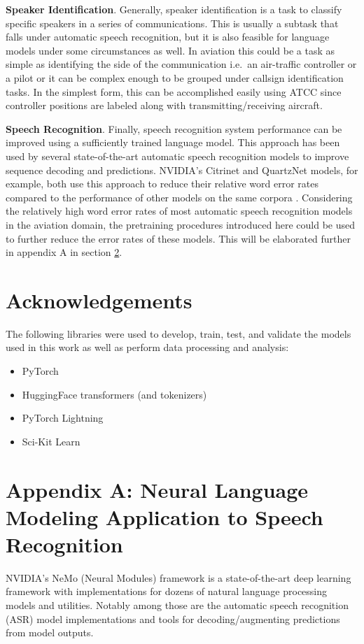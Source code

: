 \documentclass[12pt]{article}
\begin{document}
\textbf{Speaker Identification}. Generally, speaker identification is a task to classify specific speakers in a series of communications. This is
usually a subtask that falls under automatic speech recognition, but it is also feasible for language models under some circumstances as well. In
aviation this could be a task as simple as identifying the side of the communication i.e.~an air-traffic controller or a pilot or it can be complex
enough to be grouped under callsign identification tasks. In the simplest form, this can be accomplished easily using ATCC since controller positions
are labeled along with transmitting/receiving aircraft.

\textbf{Speech Recognition}. Finally, speech recognition system performance can be improved using a sufficiently trained language model. This approach
has been used by several state-of-the-art automatic speech recognition models to improve sequence decoding and predictions. NVIDIA's Citrinet and
QuartzNet models, for example, both use this approach to reduce their relative word error rates compared to the performance of other models on the
same corpora \cite{majumdar_citrinet_2021,kriman_quartznet_2020}. Considering the relatively high word error rates of most automatic speech
recognition models in the aviation domain, the pretraining procedures introduced here could be used to further reduce the error rates of these models.
This will be elaborated further in appendix A in section \ref{sec:appendix_a}.

\newpage
\section{Acknowledgements}
The following libraries were used to develop, train, test, and validate the models used in this work as well as perform data processing and analysis:
\begin{itemize}
    \item PyTorch \cite{paszke_pytorch_2019}
    \item HuggingFace transformers (and tokenizers) \cite{wolf_transformers_2020}
    \item PyTorch Lightning \cite{falcon_pytorchlightning_2019}
    \item Sci-Kit Learn \cite{pedregosa_scikit-learn_2011}
\end{itemize}

\newpage
\section{Appendix A: Neural Language Modeling Application to Speech Recognition}\label{sec:appendix_a}
NVIDIA's NeMo (Neural Modules) framework \cite{kuchaiev_nemo_2019} is a state-of-the-art deep learning framework with implementations for dozens of
natural language processing models and utilities. Notably among those are the automatic speech recognition (ASR) model implementations and tools for
decoding/augmenting predictions from model outputs.
\end{document}
